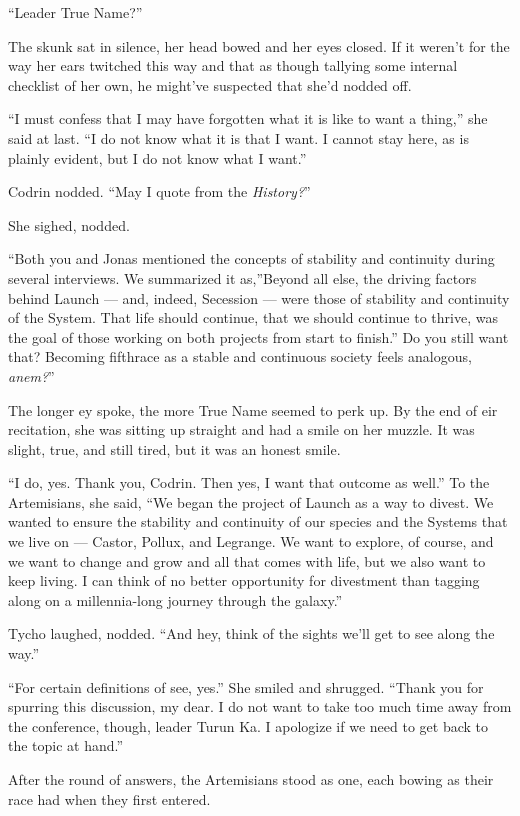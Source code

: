 ``Leader True Name?''

The skunk sat in silence, her head bowed and her eyes closed. If it weren't for the way her ears twitched this way and that as though tallying some internal checklist of her own, he might've suspected that she'd nodded off.

``I must confess that I may have forgotten what it is like to want a thing,'' she said at last. ``I do not know what it is that I want. I cannot stay here, as is plainly evident, but I do not know what I want.''

Codrin nodded. ``May I quote from the \emph{History?}''

She sighed, nodded.

``Both you and Jonas mentioned the concepts of stability and continuity during several interviews. We summarized it as,''Beyond all else, the driving factors behind Launch — and, indeed, Secession — were those of stability and continuity of the System. That life should continue, that we should continue to thrive, was the goal of those working on both projects from start to finish.'' Do you still want that? Becoming fifthrace as a stable and continuous society feels analogous, \emph{anem?}''

The longer ey spoke, the more True Name seemed to perk up. By the end of eir recitation, she was sitting up straight and had a smile on her muzzle. It was slight, true, and still tired, but it was an honest smile.

``I do, yes. Thank you, Codrin. Then yes, I want that outcome as well.'' To the Artemisians, she said, ``We began the project of Launch as a way to divest. We wanted to ensure the stability and continuity of our species and the Systems that we live on — Castor, Pollux, and Legrange. We want to explore, of course, and we want to change and grow and all that comes with life, but we also want to keep living. I can think of no better opportunity for divestment than tagging along on a millennia-long journey through the galaxy.''

Tycho laughed, nodded. ``And hey, think of the sights we'll get to see along the way.''

``For certain definitions of see, yes.'' She smiled and shrugged. ``Thank you for spurring this discussion, my dear. I do not want to take too much time away from the conference, though, leader Turun Ka. I apologize if we need to get back to the topic at hand.''

After the round of answers, the Artemisians stood as one, each bowing as their race had when they first entered.

